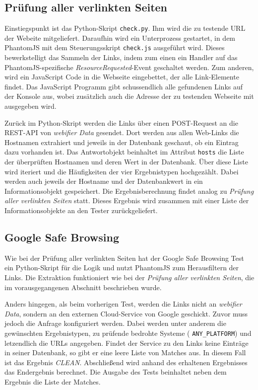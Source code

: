 \subsection{Prüfung aller verlinkten Seiten}

Einstiegspunkt ist das Python-Skript \lstinline[style=eclipse]{check.py}.
Ihm wird die zu testende \acs{URL} der Webeite mitgeliefert.
Daraufhin wird ein Unterprozess gestartet, in dem PhantomJS mit dem
Steuerungsskript \lstinline[style=eclipse]{check.js} ausgeführt wird.
Dieses bewerkstelligt das Sammeln der Links, indem zum einen ein Handler auf das
PhantomJS-spezifische \textit{ResourceRequested}-Event geschaltet werden.
Zum anderen, wird ein JavaScript Code in die Webseite eingebettet, der alle Link-Elemente findet.
Das JavaScript Programm gibt schussendlich alle gefundenen Links auf der Konsole aus, wobei zusätzlich auch die Adresse der zu testenden Webseite mit ausgegeben wird.

Zurück im Python-Skript werden die Links über einen POST-Request an die \ac{REST}-\ac{API} von
\textit{webifier Data} gesendet.
Dort werden aus allen Web-Links die Hostnamen extrahiert und jeweils in der Datenbank geschaut, ob
ein Eintrag dazu vorhanden ist.
Das Antwortobjekt beinhaltet im Attribut \lstinline[style=eclipse]{hosts} die Liste der überprüften
Hostnamen und deren Wert in der Datenbank.
Über diese Liste wird iteriert und die Häufigkeiten der vier Ergebnistypen hochgezählt.
Dabei werden auch jeweils der Hostname und der Datenbankwert in ein Informationsobjekt gespeichert.
Die Ergebnisberechnung findet analog zu \textit{Prüfung aller verlinkten Seiten} statt.
Dieses Ergebnis wird zusammen mit einer Liste der Informationsobjekte an den Tester
zurückgeliefert.

\subsection{Google Safe Browsing}

Wie bei der Prüfung aller verlinkten Seiten hat der Google Safe Browsing Test ein Python-Skript für
die Logik und nutzt PhantomJS zum Herausfiltern der Links.
Die Extraktion funktioniert wie bei der \textit{Prüfung aller verlinkten Seiten}, die im
vorausgegangenen Abschnitt beschrieben wurde.

Anders hingegen, als beim vorherigen Test, werden die Links nicht an \textit{webifier Data},
sondern an den externen Cloud-Service von Google geschickt.
Zuvor muss jedoch die Anfrage konfiguriert werden.
Dabei werden unter anderem die gewünschten Ergebnistypen, zu prüfende bedrohte Systeme (
\lstinline[style=eclipse]{ANY_PLATFORM}) und letzendlich die \acsp{URL} angegeben.
Findet der Service zu den Links keine Einträge in seiner Datenbank, so gibt er eine leere Liste von
Matches aus.
In diesem Fall ist das Ergebnis \textit{CLEAN}.
Abschließend wird anhand des erhaltenen Ergebnisses das Endergebnis berechnet. Die Ausgabe des Tests
beinhaltet neben dem Ergebnis die Liste der Matches.

